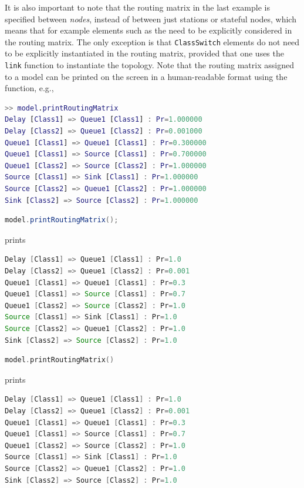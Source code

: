 It is also important to note that the routing matrix in the last example is specified between {\em nodes}, instead of between just stations or stateful nodes, which means that for example elements such as the  need to be explicitly considered in the routing matrix. The only exception is that \texttt{ClassSwitch} elements do not need to be explicitly instantiated  in the routing matrix, provided that one uses the \texttt{link} function to instantiate the topology. Note that the routing matrix assigned to a model can be printed on the screen in a human-readable format using the  function, e.g.,
\begin{MATLAB}
\begin{lstlisting}[language = matlab]
>> model.printRoutingMatrix
Delay [Class1] => Queue1 [Class1] : Pr=1.000000
Delay [Class2] => Queue1 [Class2] : Pr=0.001000
Queue1 [Class1] => Queue1 [Class1] : Pr=0.300000
Queue1 [Class1] => Source [Class1] : Pr=0.700000
Queue1 [Class2] => Source [Class2] : Pr=1.000000
Source [Class1] => Sink [Class1] : Pr=1.000000
Source [Class2] => Queue1 [Class2] : Pr=1.000000
Sink [Class2] => Source [Class2] : Pr=1.000000
\end{lstlisting}
\end{MATLAB}
\begin{JAVA}
\begin{lstlisting}[language = java, basicstyle=\ttfamily\scriptsize]
model.printRoutingMatrix();
\end{lstlisting}
prints
\begin{lstlisting}[language = java, basicstyle=\ttfamily\scriptsize]
Delay [Class1] => Queue1 [Class1] : Pr=1.0
Delay [Class2] => Queue1 [Class2] : Pr=0.001
Queue1 [Class1] => Queue1 [Class1] : Pr=0.3
Queue1 [Class1] => Source [Class1] : Pr=0.7
Queue1 [Class2] => Source [Class2] : Pr=1.0
Source [Class1] => Sink [Class1] : Pr=1.0
Source [Class2] => Queue1 [Class2] : Pr=1.0
Sink [Class2] => Source [Class2] : Pr=1.0
\end{lstlisting}
\end{JAVA}
\begin{KOTLIN}
\begin{lstlisting}[language = kotlin, basicstyle=\ttfamily\scriptsize]
model.printRoutingMatrix()
\end{lstlisting}
prints
\begin{lstlisting}[language = kotlin, basicstyle=\ttfamily\scriptsize]
Delay [Class1] => Queue1 [Class1] : Pr=1.0
Delay [Class2] => Queue1 [Class2] : Pr=0.001
Queue1 [Class1] => Queue1 [Class1] : Pr=0.3
Queue1 [Class1] => Source [Class1] : Pr=0.7
Queue1 [Class2] => Source [Class2] : Pr=1.0
Source [Class1] => Sink [Class1] : Pr=1.0
Source [Class2] => Queue1 [Class2] : Pr=1.0
Sink [Class2] => Source [Class2] : Pr=1.0
\end{lstlisting}
\end{KOTLIN}
